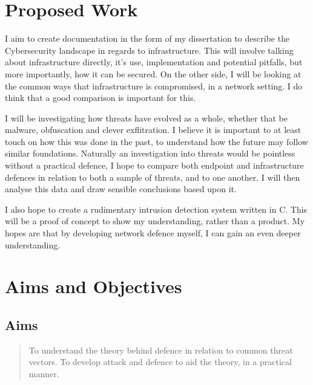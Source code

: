 \section{Proposed Work}
\label{proposed}
I aim to create documentation in the form of my dissertation to describe the Cybersecurity landscape in regards to infrastructure. 
This will involve talking about infrastructure directly, it's use, implementation and potential pitfalls, but more importantly, how it can be secured.
On the other side, I will be looking at the common ways that infrastructure is compromised, in a network setting. 
I do think that a good comparison is important for this. 

I will be investigating how threats have evolved as a whole,
whether that be malware, obfuscation and clever exflitration. I believe it is important to at least touch on how this was done in the past, 
to understand how the future may follow similar foundations. Naturally an investigation into threats would be pointless without a practical defence, 
I hope to compare both endpoint and infrastructure defences in relation to both a sample of threats, and to one another. I will then analyse this data and draw sensible conclusions based upon it.

I also hope to create a rudimentary intrusion detection system written in C. This will be a proof of concept to show my understanding, rather than a product. My hopes are that by developing network defence myself, 
I can gain an even deeper understanding.

\section{Aims and Objectives}
\subsection{Aims}
\begin{quote}
	To understand the theory behind defence in relation to common threat vectors.
	To develop attack and defence to aid the theory, in a practical manner.
\end{quote}

